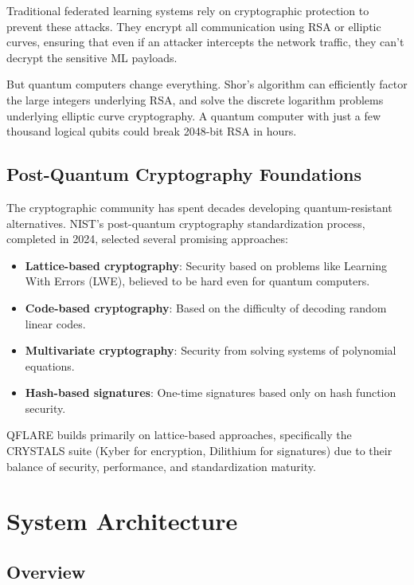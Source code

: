 \documentclass[journal,onecolumn]{IEEEtran}
\begin{document}
Traditional federated learning systems rely on cryptographic protection to prevent these attacks. They encrypt all communication using RSA or elliptic curves, ensuring that even if an attacker intercepts the network traffic, they can't decrypt the sensitive ML payloads.

But quantum computers change everything. Shor's algorithm can efficiently factor the large integers underlying RSA, and solve the discrete logarithm problems underlying elliptic curve cryptography. A quantum computer with just a few thousand logical qubits could break 2048-bit RSA in hours.

\subsection{Post-Quantum Cryptography Foundations}

The cryptographic community has spent decades developing quantum-resistant alternatives. NIST's post-quantum cryptography standardization process, completed in 2024, selected several promising approaches:

\begin{itemize}
\item \textbf{Lattice-based cryptography}: Security based on problems like Learning With Errors (LWE), believed to be hard even for quantum computers.
\item \textbf{Code-based cryptography}: Based on the difficulty of decoding random linear codes.
\item \textbf{Multivariate cryptography}: Security from solving systems of polynomial equations.
\item \textbf{Hash-based signatures}: One-time signatures based only on hash function security.
\end{itemize}

QFLARE builds primarily on lattice-based approaches, specifically the CRYSTALS suite (Kyber for encryption, Dilithium for signatures) due to their balance of security, performance, and standardization maturity.

\section{System Architecture}

\subsection{Overview}
\end{document}
